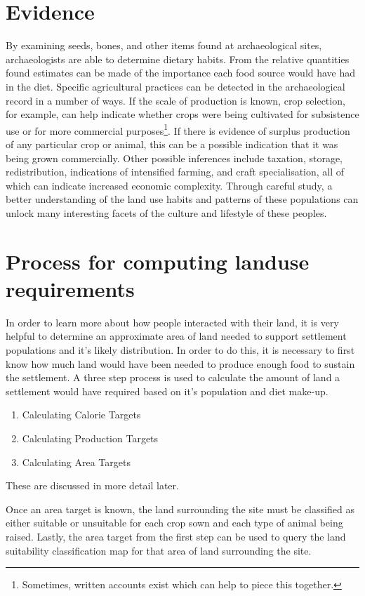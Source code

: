 \section{Evidence} \label{sec:Evidence} By examining seeds, bones, and other
items found at archaeological sites, archaeologists are able to determine 
dietary habits. From the relative quantities found estimates can be made of the
importance each food source would have had in the diet.  Specific agricultural
practices
can be detected in the archaeological record in a number of ways.  If the scale
of production is known, crop selection, for example, can help indicate whether
crops were being cultivated for subsistence use or for more commercial
purposes\footnote{Sometimes, written accounts exist which can help to
piece this together.}.  If there is evidence of surplus production of any
particular crop or animal, this can be a possible indication that it was being
grown commercially.  Other possible inferences include taxation, storage,
redistribution, indications of intensified farming, and craft specialisation,
all of which can indicate increased economic complexity.  Through careful
study, a better understanding of the land use habits and patterns of these
populations can unlock many interesting facets of the culture and lifestyle of
these peoples.

\section{Process for computing landuse requirements} \label{sec:EarlyAttempts} 

In order to learn more about how people interacted with their land, it is very
helpful to determine an approximate area of land needed to support settlement
populations and it's likely distribution.  In order to do this, it is necessary
to first know how much land would have been needed to produce enough food to
sustain the settlement.  A three step process is used to calculate the amount of
land a settlement would have required based on it's population and diet
make-up.  

\begin{enumerate}
 \item Calculating Calorie Targets
 \item Calculating Production Targets
 \item Calculating Area Targets
\end{enumerate}
These are discussed in more detail later.

Once an area target is known, the land surrounding the
site must be classified as either suitable or unsuitable for each crop sown and
each type of animal being raised.  Lastly, the area target from the first step
can be used to query the land suitability classification map for that area of
land surrounding the site.

